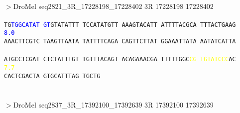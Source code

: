 \documentclass[11pt,twoside,reqno,a4paper]{article}
\begin{document}
\\
$>$DroMel	seq2821\_3R\_17228198\_17228402	3R	17228198	17228402 \\
 \\
\texttt{TG\textcolor{Blue}{T}\textcolor{Blue}{G}\textcolor{Blue}{G}\textcolor{Blue}{C}\textcolor{Blue}{A}\textcolor{Blue}{T}\textcolor{Blue}{A}\textcolor{Blue}{T}	\textcolor{Blue}{G}\textcolor{Blue}{T}GTATATTT	TCCATATGTT	AAAGTACATT	ATTTTACGCA	TTTACTGAAG	\\
\hspace*{2\charwidth}\textcolor{Blue}{8.0}\hspace*{1\charwidth}\hspace*{1\charwidth}\hspace*{1\charwidth}\hspace*{1\charwidth}\hspace*{1\charwidth}\hspace*{1\charwidth}\\
AAACTTCGTC	TAAGTTAATA	TATTTTCAGA	CAGTTCTTAT	GGAAATTATA	AATATCATTA	\\
\hspace*{1\charwidth}\hspace*{1\charwidth}\hspace*{1\charwidth}\hspace*{1\charwidth}\hspace*{1\charwidth}\hspace*{1\charwidth}\\
ATGCCTCGAT	CTCTATTTGT	TGTTTACAGT	ACAGAAACGA	TTTTTGGC\textcolor{Yellow}{C}\textcolor{Yellow}{G}	\textcolor{Yellow}{T}\textcolor{Yellow}{G}\textcolor{Yellow}{T}\textcolor{Yellow}{A}\textcolor{Yellow}{T}\textcolor{Yellow}{C}\textcolor{Yellow}{C}\textcolor{Yellow}{C}AC	\\
\hspace*{1\charwidth}\hspace*{1\charwidth}\hspace*{1\charwidth}\hspace*{1\charwidth}\hspace*{48\charwidth}\textcolor{Yellow}{7.7}\hspace*{1\charwidth}\\
CACTCGACTA	GTGCATTTAG	TGCTG\\
\hspace*{1\charwidth}\hspace*{1\charwidth}\\
}
\\
$>$DroMel	seq2837\_3R\_17392100\_17392639	3R	17392100	17392639 \\
\end{document}
